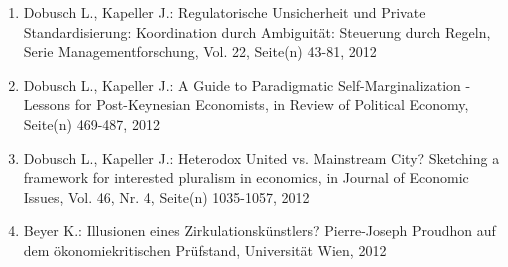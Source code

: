 \begin{enumerate}
	 \item Dobusch L., Kapeller J.: Regulatorische Unsicherheit und Private Standardisierung: Koordination durch Ambiguität: Steuerung durch Regeln, Serie Managementforschung, Vol. 22, Seite(n) 43-81, 2012
	 \item Dobusch L., Kapeller J.: A Guide to Paradigmatic Self-Marginalization - Lessons for Post-Keynesian Economists, in Review of Political Economy, Seite(n) 469-487, 2012
	 \item Dobusch L., Kapeller J.: Heterodox United vs. Mainstream City? Sketching a framework for interested pluralism in economics, in Journal of Economic Issues, Vol. 46, Nr. 4, Seite(n) 1035-1057, 2012
	 \item Beyer K.: Illusionen eines Zirkulationskünstlers? Pierre-Joseph Proudhon auf dem ökonomiekritischen Prüfstand, Universität Wien, 2012
\end{enumerate}
